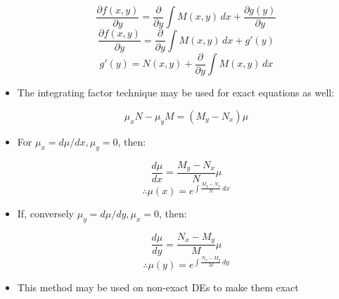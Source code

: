 \documentclass[12pt]{article}
\begin{document}
\begin{itemize}
    
    $$\frac{\partial f(x,y)}{\partial y}=\frac{\partial}{\partial y}\int M(x,y)\,dx+ \frac{\partial g(y)}{\partial y}$$
    $$\frac{\partial f(x,y)}{\partial y}=\frac{\partial}{\partial y}\int M(x,y)\,dx+ g'(y)$$
    $$g'(y)=N(x,y)+\frac{\partial}{\partial y}\int M(x,y)\,dx$$

  \item The integrating factor technique may be used for exact equations as well:

    $$\mu_xN-\mu_yM=(M_y-N_x)\mu$$

  \item For $\mu_x=d\mu/dx, \mu_y=0$, then:

    $$\frac{d\mu}{dx}=\frac{M_y-N_x}{N}\mu$$
    $$\therefore \mu(x)=e^{\int\frac{M_y-N_x}{N}\,dx}$$

\item If, conversely $\mu_y=d\mu/dy, \mu_x=0$, then:
  
    $$\frac{d\mu}{dy}=\frac{N_x-M_y}{M}\mu$$
    $$\therefore \mu(y)=e^{\int\frac{N_x-M_y}{M}\,dy}$$
    
  \item This method may be used on non-exact DEs to make them exact

\end{itemize}
\end{document}
